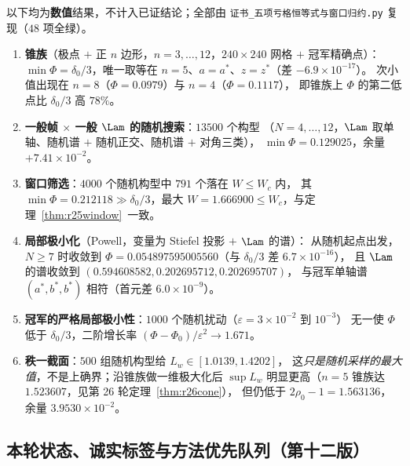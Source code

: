 以下均为\textbf{数值}结果，不计入已证结论；全部由
\texttt{证书\_五项亏格恒等式与窗口归约.py} 复现（$48$ 项全绿）。
\begin{enumerate}\itemsep2pt
\item \textbf{锥族}（极点 $+$ 正 $n$ 边形，$n=3,\dots,12$，$240\times240$ 网格 $+$ 冠军精确点）：
$\min\Phi=\delta_0/3$，唯一取等在 $n=5$、$a=a^*$、$z=z^*$（差 $-6.9\times10^{-17}$）。
次小值出现在 $n=8$（$\Phi=0.0979$）与 $n=4$（$\Phi=0.1117$），
即锥族上 $\Phi$ 的第二低点比 $\delta_0/3$ 高 $78\%$。
\item \textbf{一般帧 $\times$ 一般 $\Lam$ 的随机搜索}：$13500$ 个构型
（$N=4,\dots,12$，$\Lam$ 取单轴、随机谱 $+$ 随机正交、随机谱 $+$ 对角三类），
$\min\Phi=0.129025$，余量 $+7.41\times10^{-2}$。
\item \textbf{窗口筛选}：$4000$ 个随机构型中 $791$ 个落在 $W\le W_c$ 内，
其 $\min\Phi=0.212118\gg\delta_0/3$，最大 $W=1.666900\le W_c$，与定理~\ref{thm:r25window}~一致。
\item \textbf{局部极小化}（Powell，变量为 Stiefel 投影 $+$ $\Lam$ 的谱）：
从随机起点出发，$N\ge7$ 时收敛到 $\Phi=0.054897595005560$（与 $\delta_0/3$ 差 $6.7\times10^{-16}$），
且 $\Lam$ 的谱收敛到 $(0.594608582,0.202695712,0.202695707)$，
与冠军单轴谱 $(a^*,b^*,b^*)$ 相符（首元差 $6.0\times10^{-9}$）。
\item \textbf{冠军的严格局部极小性}：$1000$ 个随机扰动（$\varepsilon=3\times10^{-2}$ 到 $10^{-3}$）
无一使 $\Phi$ 低于 $\delta_0/3$，二阶增长率 $(\Phi-\Phi_0)/\varepsilon^2\to1.671$。
\item \textbf{秩一截面}：$500$ 组随机构型给 $L_w\in[1.0139,1.4202]$，
这\emph{只是随机采样的最大值}，不是上确界；沿锥族做一维极大化后
$\sup L_w$ 明显更高（$n=5$ 锥族达 $1.523607$，见第 26 轮定理~\ref{thm:r26cone}），
但仍低于 $2\rho_0-1=1.563136$，余量 $3.9530\times10^{-2}$。
\end{enumerate}

\subsection{本轮状态、诚实标签与方法优先队列（第十二版）}\label{sec:r25:status}

